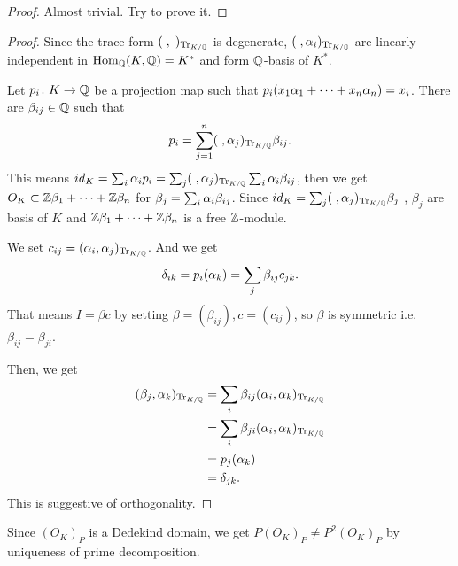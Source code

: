
\begin{proof}
  Almost trivial. Try to prove it.
\end{proof}


\begin{proof}
  Since the trace form $(\;,\;)_{\operatorname{Tr}_{K/{\mathbb Q}}}$ is degenerate, $(\;, {\alpha}_i)_{\operatorname{Tr}_{K/{\mathbb Q}}}$ are linearly independent in $\operatorname{Hom}_{{\mathbb Q}} (K,{\mathbb Q}) = K^*$ and form ${\mathbb Q}$-basis of $K^*$.

  Let $p_i \colon K \to {\mathbb Q}$ be a projection map such that $p_i(x_1{\alpha}_1 + \cdots + x_n{\alpha}_n) = x_i$. There are $\beta_{ij} \in {\mathbb Q}$ such that
  \[
  p_i = \sum_{j=1}^n (\;, {\alpha}_j)_{\operatorname{Tr}_{K/{\mathbb Q}}} \beta_{ij}.
  \]
  This means $id_K = \sum_i {\alpha}_i p_i = \sum_j (\;, {\alpha}_j)_{\operatorname{Tr}_{K/{\mathbb Q}}} \sum_i {\alpha}_i \beta_{ij}$, then we get
  $O_K \subset {\mathbb Z} \beta_1 + \cdots + {\mathbb Z} \beta_n$ for $\beta_j = \sum_i {\alpha}_i \beta_{ij}$. Since $id_K  = \sum_j (\;, {\alpha}_j)_{\operatorname{Tr}_{K/{\mathbb Q}}} \beta_j$ , $\beta_j$ are basis of $K$ and ${\mathbb Z} \beta_1 + \cdots + {\mathbb Z} \beta_n$ is a free ${\mathbb Z}$-module.

  We set $c_{ij} = ({\alpha}_i, {\alpha}_j)_{\operatorname{Tr}_{K/{\mathbb Q}}}$. And we get
  \[
  {\delta}_{ik} = p_i({\alpha}_k) = \sum_j \beta_{ij} c_{jk}.
  \]
  That means $I = \beta c$ by setting $\beta = (\beta_{ij}), c=(c_{ij})$, so $\beta$ is symmetric i.e. $\beta_{ij} = \beta_{ji}$.

  Then, we get
  \begin{align*}
    (\beta_j, {\alpha}_k)_{\operatorname{Tr}_{K/{\mathbb Q}}} &= \sum_i \beta_{ij} ({\alpha}_i, {\alpha}_k)_{\operatorname{Tr}_{K/{\mathbb Q}}} \\
    &= \sum_i \beta_{ji} ({\alpha}_i, {\alpha}_k)_{\operatorname{Tr}_{K/{\mathbb Q}}} \\
    &= p_j({\alpha}_k ) \\
    &= {\delta}_{jk}.
  \end{align*}
  This is suggestive of orthogonality.
\end{proof}



\begin{rem}
  Since $(O_K)_P$ is a Dedekind domain, we get $P(O_K)_P \neq P^2(O_K)_P$ by uniqueness of prime decomposition.
\end{rem}


